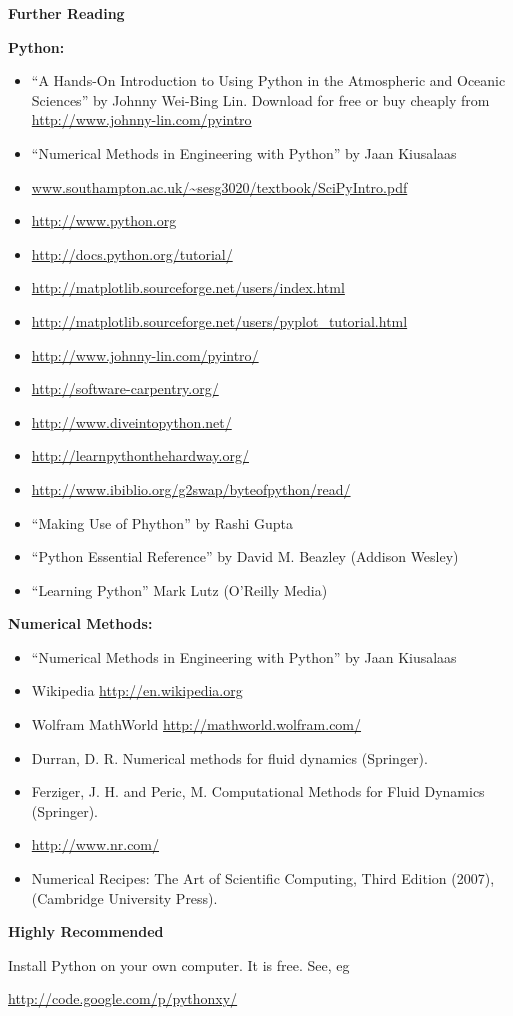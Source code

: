 \clearpage

{\bf\large Further Reading}

{\bf Python:}
\begin{itemize}
\item ``A Hands-On Introduction to Using Python in the Atmospheric and Oceanic Sciences'' by Johnny Wei-Bing Lin. Download for free or buy cheaply from \url{http://www.johnny-lin.com/pyintro}
\item  ``Numerical Methods in Engineering with Python'' by Jaan Kiusalaas
\item \url{www.southampton.ac.uk/~sesg3020/textbook/SciPyIntro.pdf}
\item \url{http://www.python.org}
\item \url{http://docs.python.org/tutorial/}
\item \url{http://matplotlib.sourceforge.net/users/index.html}
\item \url{http://matplotlib.sourceforge.net/users/pyplot_tutorial.html}
\item \url{http://www.johnny-lin.com/pyintro/}
\item \url{http://software-carpentry.org/}
\item \url{http://www.diveintopython.net/}
\item \url{http://learnpythonthehardway.org/}
\item \url{http://www.ibiblio.org/g2swap/byteofpython/read/}
\item ``Making Use of Phython'' by Rashi Gupta
\item ``Python Essential Reference'' by David M. Beazley (Addison Wesley)
\item ``Learning Python'' Mark Lutz (O’Reilly Media)
\end{itemize}

{\bf Numerical Methods:}
\begin{itemize}
\item  ``Numerical Methods in Engineering with Python'' by Jaan Kiusalaas
\item Wikipedia \url{http://en.wikipedia.org}
\item Wolfram MathWorld \url{http://mathworld.wolfram.com/}

\item Durran, D. R. Numerical methods for fluid dynamics (Springer).

\item Ferziger, J. H. and Peric, M. Computational Methods for Fluid Dynamics (Springer).
\item \url{http://www.nr.com/}
\item Numerical Recipes: The Art of Scientific Computing, Third Edition (2007), (Cambridge University Press).
\end{itemize}

{\bf\large Highly Recommended}

{\color{red}
Install Python on your own computer. It is free. See, eg 

\url{http://code.google.com/p/pythonxy/}
}

